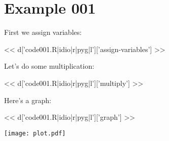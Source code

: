 \section{Example 001}

First we assign variables:

<< d['code001.R|idio|r|pyg|l']['assign-variables'] >>

Let's do some multiplication:

<< d['code001.R|idio|r|pyg|l']['multiply'] >>

Here's a graph:

<< d['code001.R|idio|r|pyg|l']['graph'] >>

\texttt{[image: plot.pdf]}

